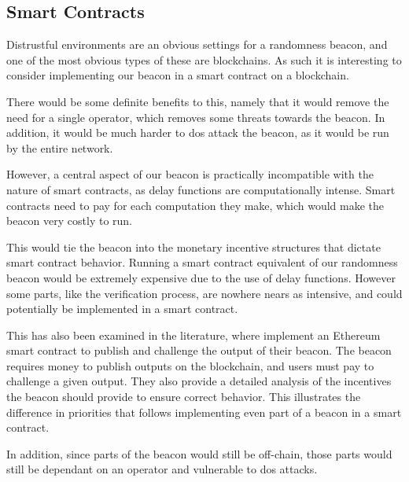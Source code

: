 \subsection{Smart Contracts}
Distrustful environments are an obvious settings for a randomness beacon, and one of the most obvious types of these are blockchains. As such it is interesting to consider implementing our beacon in a smart contract on a blockchain.

There would be some definite benefits to this, namely that it would remove the need for a single operator, which removes some threats towards the beacon. In addition, it would be much harder to \acrshort{dos} attack the beacon, as it would be run by the entire network.

However, a central aspect of our beacon is practically incompatible with the nature of smart contracts, as delay functions are computationally intense. Smart contracts need to pay for each computation they make, which would make the beacon very costly to run.

This would tie the beacon into the monetary incentive structures that dictate smart contract behavior. Running a smart contract equivalent of our randomness beacon would be extremely expensive due to the use of delay functions. However some parts, like the verification process, are nowhere nears as intensive, and could potentially be implemented in a smart contract.

This has also been examined in the literature, where \citet{bunz2017proofsof} implement an Ethereum smart contract to publish and challenge the output of their beacon. The beacon requires money to publish outputs on the blockchain, and users must pay to challenge a given output. They also provide a detailed analysis of the incentives the beacon should provide to ensure correct behavior. This illustrates the difference in priorities that follows implementing even part of a beacon in a smart contract.

In addition, since parts of the beacon would still be off-chain, those parts would still be dependant on an operator and vulnerable to \acrshort{dos} attacks.


